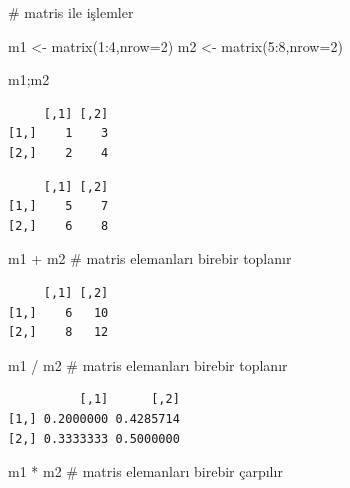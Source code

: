 \documentclass[
  letterpaper,
  DIV=11,
  numbers=noendperiod]{scrreprt}
\newenvironment{Shaded}{\begin{snugshade}}{\end{snugshade}}
\newcommand{\AttributeTok}[1]{\textcolor[rgb]{0.40,0.45,0.13}{#1}}
\newcommand{\CommentTok}[1]{\textcolor[rgb]{0.37,0.37,0.37}{#1}}
\newcommand{\DecValTok}[1]{\textcolor[rgb]{0.68,0.00,0.00}{#1}}
\newcommand{\FunctionTok}[1]{\textcolor[rgb]{0.28,0.35,0.67}{#1}}
\newcommand{\NormalTok}[1]{\textcolor[rgb]{0.00,0.23,0.31}{#1}}
\newcommand{\OtherTok}[1]{\textcolor[rgb]{0.00,0.23,0.31}{#1}}
\newcommand{\SpecialCharTok}[1]{\textcolor[rgb]{0.37,0.37,0.37}{#1}}
\begin{document}
\begin{Shaded}
\begin{Highlighting}[]
\CommentTok{\# matris ile işlemler}

\NormalTok{m1 }\OtherTok{\textless{}{-}} \FunctionTok{matrix}\NormalTok{(}\DecValTok{1}\SpecialCharTok{:}\DecValTok{4}\NormalTok{,}\AttributeTok{nrow=}\DecValTok{2}\NormalTok{)}
\NormalTok{m2 }\OtherTok{\textless{}{-}} \FunctionTok{matrix}\NormalTok{(}\DecValTok{5}\SpecialCharTok{:}\DecValTok{8}\NormalTok{,}\AttributeTok{nrow=}\DecValTok{2}\NormalTok{)}

\NormalTok{m1;m2}
\end{Highlighting}
\end{Shaded}

\begin{verbatim}
     [,1] [,2]
[1,]    1    3
[2,]    2    4
\end{verbatim}

\begin{verbatim}
     [,1] [,2]
[1,]    5    7
[2,]    6    8
\end{verbatim}

\begin{Shaded}
\begin{Highlighting}[]
\NormalTok{m1 }\SpecialCharTok{+}\NormalTok{ m2 }\CommentTok{\# matris elemanları birebir toplanır}
\end{Highlighting}
\end{Shaded}

\begin{verbatim}
     [,1] [,2]
[1,]    6   10
[2,]    8   12
\end{verbatim}

\begin{Shaded}
\begin{Highlighting}[]
\NormalTok{m1 }\SpecialCharTok{/}\NormalTok{ m2 }\CommentTok{\# matris elemanları birebir toplanır}
\end{Highlighting}
\end{Shaded}

\begin{verbatim}
          [,1]      [,2]
[1,] 0.2000000 0.4285714
[2,] 0.3333333 0.5000000
\end{verbatim}

\begin{Shaded}
\begin{Highlighting}[]
\NormalTok{m1 }\SpecialCharTok{*}\NormalTok{ m2 }\CommentTok{\# matris elemanları birebir çarpılır}
\end{Highlighting}
\end{Shaded}
\end{document}
